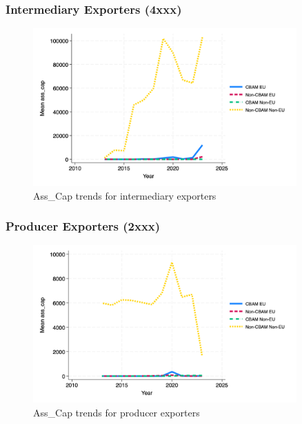 \documentclass{article}
\begin{document}
\subsubsection{Intermediary Exporters (4xxx)}
\begin{figure}[h!]
\centering
\includegraphics[width=0.9\textwidth]{ass_cap_ei.png}
\caption{Ass_Cap trends for intermediary exporters}
\label{fig:ass_cap_ei}
\end{figure}

\subsubsection{Producer Exporters (2xxx)}
\begin{figure}[h!]
\centering
\includegraphics[width=0.9\textwidth]{ass_cap_ep.png}
\caption{Ass_Cap trends for producer exporters}
\label{fig:ass_cap_ep}
\end{figure}
\end{document}
